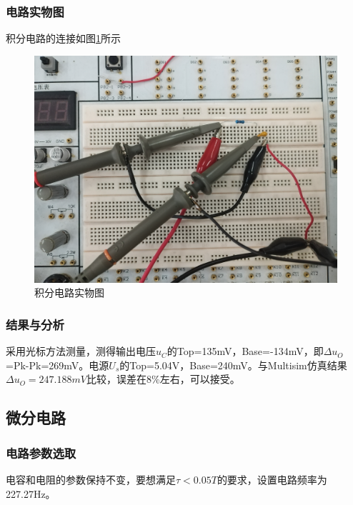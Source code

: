 \documentclass{ctexart}
\begin{document}
\subsubsection{电路实物图}
积分电路的连接如图\ref{fig:积分电路实物图}所示
\begin{figure}[h]
    \centering
    \includegraphics[scale=0.08]{pic/int_cir.jpg}
    \caption{积分电路实物图}
    \label{fig:积分电路实物图}
\end{figure}
\subsubsection{结果与分析}
采用光标方法测量，测得输出电压$u_C$的Top=135mV，Base=-134mV，即$\Delta u_O$=Pk-Pk=269mV。电源$U_s$的Top=5.04V，Base=240mV。与Multisim仿真结果$\Delta u_O= 247.188mV$比较，误差在8\%左右，可以接受。
\subsection{微分电路}
\subsubsection{电路参数选取}
电容和电阻的参数保持不变，要想满足$\tau < 0.05T$的要求，设置电路频率为227.27Hz。
\end{document}
